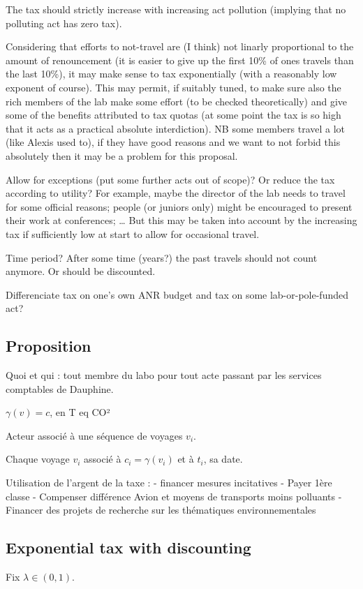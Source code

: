 \documentclass[version=3.21, pagesize, twoside=off, bibliography=totoc, DIV=calc, fontsize=12pt, a4paper, french, english]{scrartcl}
\begin{document}
The tax should strictly increase with increasing act pollution (implying that no polluting act has zero tax).

Considering that efforts to not-travel are (I think) not linarly proportional to the amount of renouncement (it is easier to give up the first 10\% of ones travels than the last 10\%), it may make sense to tax exponentially (with a reasonably low exponent of course). This may permit, if suitably tuned, to make sure also the rich members of the lab make some effort (to be checked theoretically) and give some of the benefits attributed to tax quotas (at some point the tax is so high that it acts as a practical absolute interdiction). NB some members travel a lot (like Alexis used to), if they have good reasons and we want to not forbid this absolutely then it may be a problem for this proposal.

Allow for exceptions (put some further acts out of scope)? Or reduce the tax according to utility? For example, maybe the director of the lab needs to travel for some official reasons; people (or juniors only) might be encouraged to present their work at conferences; … But this may be taken into account by the increasing tax if sufficiently low at start to allow for occasional travel.

Time period? After some time (years?) the past travels should not count anymore. Or should be discounted.

Differenciate tax on one’s own ANR budget and tax on some lab-or-pole-funded act?

\subsection{Proposition}
Quoi et qui : tout membre du labo pour tout acte passant par les services comptables de Dauphine.

$\gamma(v) = c$, en T eq CO²

Acteur associé à une séquence de voyages $v_i$.

Chaque voyage $v_i$ associé à $c_i = \gamma(v_i)$ et à $t_i$, sa date.

Utilisation de l’argent de la taxe :
- financer mesures incitatives
- Payer 1ère classe
- Compenser différence Avion et moyens de transports moins polluants
- Financer des projets de recherche sur les thématiques environnementales

\subsection{Exponential tax with discounting}
Fix $λ \in (0, 1)$.
\end{document}
